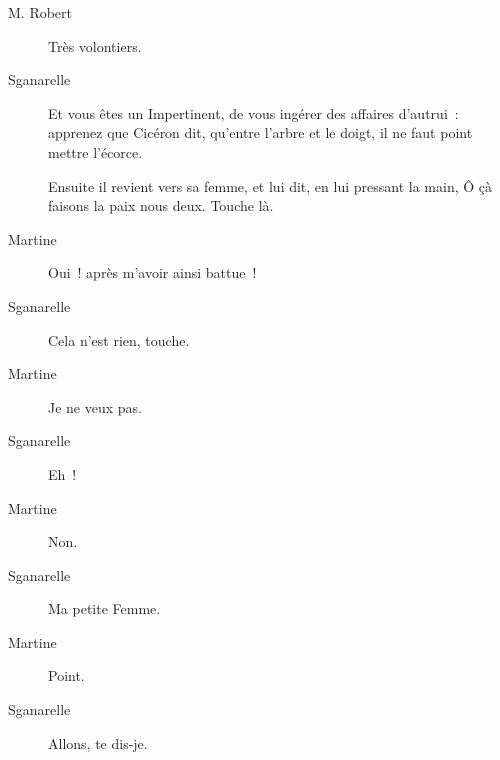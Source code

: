 \documentclass[french,twoside]{book} %
\begin{document}
 \begin{description} \item[M. Robert] 

Très volontiers.\end{description}
 \begin{description} \item[Sganarelle] 

Et vous êtes un Impertinent, de vous ingérer des affaires d’autrui : apprenez que Cicéron dit, qu’entre l’arbre et le doigt, il ne faut point mettre l’écorce.

Ensuite il revient vers sa femme, et lui dit, en lui pressant la main, Ô çà faisons la paix nous deux. Touche là.\end{description}
 \begin{description} \item[Martine] 

Oui ! après m’avoir ainsi battue !\end{description}
 \begin{description} \item[Sganarelle] 

Cela n’est rien, touche.\end{description}
 \begin{description} \item[Martine] 

Je ne veux pas.\end{description}
 \begin{description} \item[Sganarelle] 

Eh !\end{description}
 \begin{description} \item[Martine] 

Non.\end{description}
 \begin{description} \item[Sganarelle] 

Ma petite Femme.\end{description}
 \begin{description} \item[Martine] 

Point.\end{description}
 \begin{description} \item[Sganarelle] 

Allons, te dis-je.\end{description}
\end{document}
